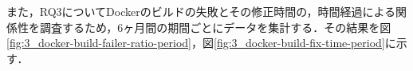 
また，RQ3についてDockerのビルドの失敗とその修正時間の，時間経過による関係性を調査するため，6ヶ月間の期間ごとにデータを集計する．その結果を図\ref{fig:3_docker-build-failer-ratio-period}，図\ref{fig:3_docker-build-fix-time-period}に示す．





